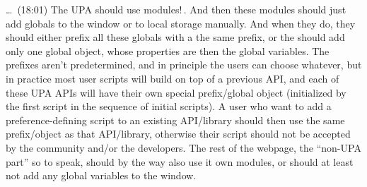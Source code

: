 \documentclass{report}
\begin{document}
\ldots\ (18:01) The UPA should use modules!\,. And then these modules should just add globals to the window or to local storage manually. And when they do, they should either prefix all these globals with a the same prefix, or the should add only one global object, whose properties are then the global variables. The prefixes aren't predetermined, and in principle the users can choose whatever, but in practice most user scripts will build on top of a previous API, and each of these UPA APIs will have their own special prefix/global object (initialized by the first script in the sequence of initial scripts). A user who want to add a preference-defining script to an existing API/library should then use the same prefix/object as that API/library, otherwise their script should not be accepted by the community and/or the developers. The rest of the webpage, the ``non-UPA part'' so to speak, should by the way also use it own modules, or should at least not add any global variables to the window. 
\end{document}
